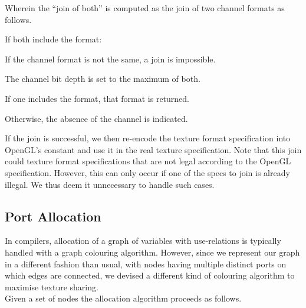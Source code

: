 \documentclass[format=sigconf]{acmart}
\begin{document}
Wherein the ``join of both'' is computed as the join of two channel formats as follows.

\begin{step}
\item If both include the format:
  \begin{step}
  \item If the channel format is not the same, a join is impossible.
  \item The channel bit depth is set to the maximum of both.
  \end{step}
\item If one includes the format, that format is returned.
\item Otherwise, the absence of the channel is indicated.
\end{step}

If the join is successful, we then re-encode the texture format specification into OpenGL's constant and use it in the real texture specification. Note that this join could texture format specifications that are not legal according to the OpenGL specification. However, this can only occur if one of the specs to join is already illegal. We thus deem it unnecessary to handle such cases.

\subsection{Port Allocation}\label{port-allocation}
In compilers, allocation of a graph of variables with use-relations is typically handled with a graph colouring algorithm. However, since we represent our graph in a different fashion than usual, with nodes having multiple distinct ports on which edges are connected, we devised a different kind of colouring algorithm to maximise texture sharing. \\

Given a set of nodes the allocation algorithm proceeds as follows.
\end{document}
